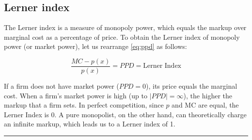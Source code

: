 \subsection{Lerner index}\label{lerner-index}

The Lerner index is a measure of monopoly power, which equals the markup over marginal cost as a percentage of price. To obtain the Lerner index of monopoly power (or market power), let us rearrange \autoref{eq:ppd} as follows:

\[ \frac{MC - p(x)}{p(x)} = PPD = \text{Lerner Index} \]

If a firm does not have market power (\(PPD = 0\)), its price equals the marginal cost. When a firm's market power is high (up to \(|PPD| = \infty\)), the higher the markup that a firm sets. In perfect competition, since \(p\) and MC are equal, the Lerner Index is 0. A pure monopolist, on the other hand, can theoretically charge an infinite markup, which leads us to a Lerner index of 1.

\begin{center}\rule{0.5\linewidth}{0.5pt}\end{center}
